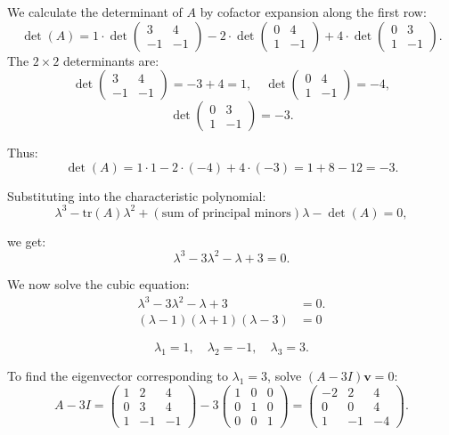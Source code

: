 \documentclass[
  letterpaper,
  DIV=11,
  numbers=noendperiod]{scrreprt}
\theoremstyle{plain}
\theoremstyle{definition}
\theoremstyle{remark}
\begin{document}
We calculate the determinant of \(A\) by cofactor expansion along the
first row: \[
\det(A) = 1 \cdot \det\begin{pmatrix} 3 & 4 \\ -1 & -1 \end{pmatrix} - 2 \cdot \det\begin{pmatrix} 0 & 4 \\ 1 & -1 \end{pmatrix} + 4 \cdot \det\begin{pmatrix} 0 & 3 \\ 1 & -1 \end{pmatrix}.
\] The \(2 \times 2\) determinants are: \[
\det\begin{pmatrix} 3 & 4 \\ -1 & -1 \end{pmatrix} = -3 + 4 = 1, \quad \det\begin{pmatrix} 0 & 4 \\ 1 & -1 \end{pmatrix} = -4,
\] \[
\det\begin{pmatrix} 0 & 3 \\ 1 & -1 \end{pmatrix} = -3.
\]

Thus: \[
\det(A) = 1 \cdot 1 - 2 \cdot (-4) + 4 \cdot (-3) = 1 + 8 - 12 = -3.
\]

Substituting into the characteristic polynomial: \[
\lambda^3 - \text{tr}(A)\lambda^2 + (\text{sum of principal minors})\lambda - \det(A) = 0,
\]

we get: \[
\lambda^3 - 3\lambda^2 - \lambda + 3 = 0.
\]

We now solve the cubic equation: \begin{align*}
   \lambda^3 - 3\lambda^2 - \lambda + 3& = 0. \\
   (\lambda-1)(\lambda+1)(\lambda -3)&=0
\end{align*}

\[\lambda_1 = 1, \quad \lambda_2 = -1, \quad \lambda_3 = 3.\]

To find the eigenvector corresponding to \(\lambda_1 = 3\), solve
\((A - 3I)\mathbf{v} = 0\): \[
A - 3I = \begin{pmatrix} 1 & 2 & 4 \\ 0 & 3 & 4 \\ 1 & -1 & -1 \end{pmatrix} - 3\begin{pmatrix} 1 & 0 & 0 \\ 0 & 1 & 0 \\ 0 & 0 & 1 \end{pmatrix} = \begin{pmatrix} -2 & 2 & 4 \\ 0 & 0 & 4 \\ 1 & -1 & -4 \end{pmatrix}.
\]
\end{document}
